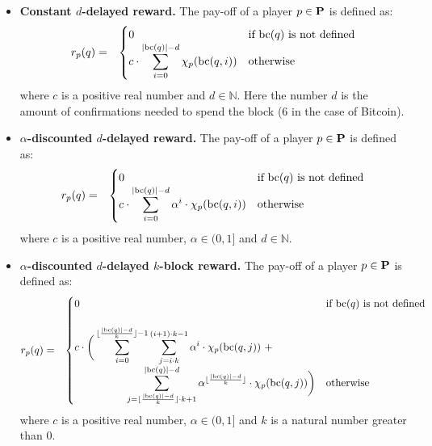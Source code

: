 \documentclass{article}
\begin{document}
\begin{itemize}
\item {\bf Constant $d$-delayed reward.} The pay-off of a player $p \in \mathbf{P}$ is defined as:
\begin{eqnarray*}
r_p(q) & = & 
\begin{cases}
0 & \text{if } \text{bc}(q) \text{ is not defined}\\
{\displaystyle c \cdot \sum_{i=0}^{|\text{bc}(q)|-d} \chi_p(\text{bc}(q,i))} & \text{otherwise}
\end{cases}
\end{eqnarray*}
where $c$ is a positive real number and $d \in \mathbb{N}$. Here the number $d$ is the amount of confirmations needed to spend the block (6 in the case of Bitcoin).

\item {\bf $\alpha$-discounted  $d$-delayed reward.} The pay-off of a player $p \in \mathbf{P}$ is defined as:
\begin{eqnarray*}
r_p(q) & = & 
\begin{cases}
0 & \text{if } \text{bc}(q) \text{ is not defined}\\
{\displaystyle c \cdot \sum_{i=0}^{|\text{bc}(q)|-d} \alpha^i \cdot \chi_p(\text{bc}(q,i))} & \text{otherwise}
\end{cases}
\end{eqnarray*}
where $c$ is a positive real number, $\alpha \in (0,1]$ and $d \in \mathbb{N}$. 

\item {\bf $\alpha$-discounted $d$-delayed $k$-block reward.} The pay-off of a player $p \in \mathbf{P}$ is defined as:
\begin{eqnarray*}
r_p(q) & = & 
\begin{cases}
0 & \text{if } \text{bc}(q) \text{ is not defined}\\
\\
{\displaystyle c \cdot \bigg(
\sum_{i=0}^{\lfloor\frac{|\text{bc}(q)|-d}{k}\rfloor-1}
\sum_{j=i \cdot k}^{(i+1) \cdot k -1} \alpha^i \cdot \chi_p(\text{bc}(q,j))
\ +}\\
{\displaystyle  \hspace{50pt} \sum_{j= \lfloor\frac{|\text{bc}(q)|-d}{k}\rfloor \cdot k + 1}^{|\text{bc}(q)|-d} \alpha^{\lfloor\frac{|\text{bc}(q)|-d}{k}\rfloor} \cdot \chi_p(\text{bc}(q,j))\bigg)}
& \text{otherwise}
\end{cases}
\end{eqnarray*}
where $c$ is a positive real number, $\alpha \in (0,1]$ and $k$ is a natural number greater than 0.
\end{itemize}
\end{document}
